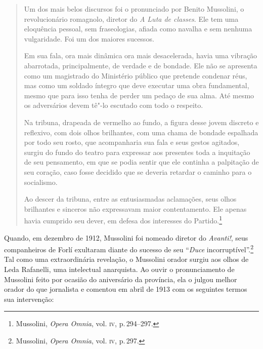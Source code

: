 \begin{quote}
Um dos mais belos discursos foi o pronunciado por Benito Mussolini, o
revolucionário romagnolo, diretor do \emph{A Luta de classes}. Ele tem
uma eloquência pessoal, sem fraseologias, afiada como navalha e sem
nenhuma vulgaridade. Foi um dos maiores sucessos.

Em sua fala, ora mais dinâmica ora mais desacelerada, havia uma vibração
abarrotada, principalmente, de verdade e de bondade. Ele não se
apresenta como um magistrado do Ministério público que pretende condenar
réus, mas como um soldado íntegro que deve executar uma obra
fundamental, mesmo que para isso tenha de perder um pedaço de sua alma.
Até mesmo os adversários devem tê"-lo escutado com todo o respeito.

Na tribuna, drapeada de vermelho ao fundo, a figura desse jovem discreto
e reflexivo, com dois olhos brilhantes, com uma chama de bondade
espalhada por todo seu rosto, que acompanharia sua fala e seus gestos
agitados, surgiu do fundo do teatro para expressar aos presentes toda a
inquitação de seu pensamento, em que se podia sentir que ele continha a
palpitação de seu coração, caso fosse decidido que se deveria retardar o
caminho para o socialismo.

Ao descer da tribuna, entre as entusiasmadas aclamações, seus olhos
brilhantes e sinceros não expressavam maior contentamento. Ele apenas
havia cumprido seu dever, em defesa dos interesses do Partido.\footnote{Mussolini,
  \emph{Opera Omnia}, vol. \textsc{iv}, p.\,294--297.}
\end{quote}

Quando, em dezembro de 1912, Mussolini foi nomeado diretor do
\emph{Avanti!}, seus companheiros de Forlí exultaram diante do sucesso
de seu ``\emph{Duce} incorruptível''.\footnote{Mussolini, \emph{Opera
  Omnia}, vol. \textsc{iv}, p.\,297.} Tal como uma extraordinária revelação, o
Mussolini orador surgiu aos olhos de Leda Rafanelli, uma intelectual
anarquista. Ao ouvir o pronunciamento de Mussolini feito por ocasião do
aniversário da província, ela o julgou melhor orador do que jornalista e
comentou em abril de 1913 com os seguintes termos sua intervenção:

